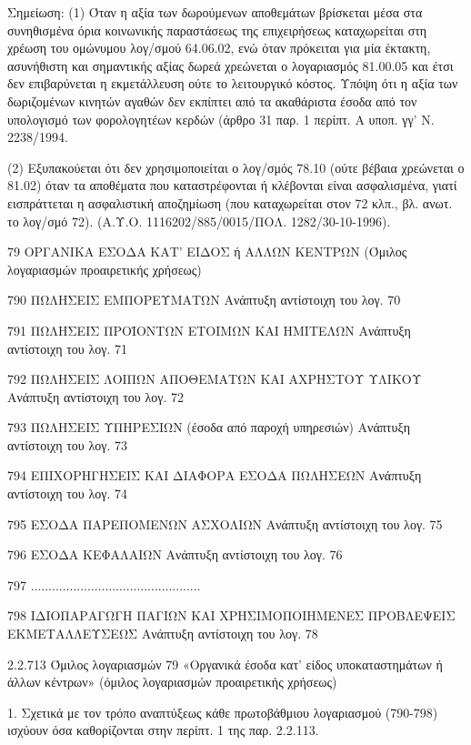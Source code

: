 \documentclass[A4,10pt,greek]{book}
\begin{document}
Σημείωση: (1) Όταν η αξία των δωρούμενων αποθεμάτων βρίσκεται μέσα στα συνηθισμένα όρια κοινωνικής παραστάσεως της επιχειρήσεως καταχωρείται στη χρέωση του ομώνυμου λογ/σμού 64.06.02, ενώ όταν πρόκειται για μία έκτακτη, ασυνήθιστη και σημαντικής αξίας δωρεά χρεώνεται ο λογαριασμός 81.00.05 και έτσι δεν επιβαρύνεται η εκμετάλλευση ούτε το λειτουργικό κόστος. Υπόψη ότι η αξία των δωριζομένων κινητών αγαθών δεν εκπίπτει από τα ακαθάριστα έσοδα από τον υπολογισμό των φορολογητέων κερδών (άρθρο 31 παρ. 1 περίπτ. Α υποπ. γγ' Ν. 2238/1994.

(2) Εξυπακούεται ότι δεν χρησιμοποιείται ο λογ/σμός 78.10 (ούτε βέβαια χρεώνεται ο 81.02) όταν τα αποθέματα που καταστρέφονται ή κλέβονται είναι ασφαλισμένα, γιατί εισπράττεται η ασφαλιστική αποζημίωση (που καταχωρείται στον 72 κλπ., βλ. ανωτ. το λογ/σμό 72). (Α.Υ.Ο. 1116202/885/0015/ΠΟΛ. 1282/30-10-1996).

79    ΟΡΓΑΝΙΚΑ ΕΣΟΔΑ ΚΑΤ' ΕΙΔΟΣ ή ΑΛΛΩΝ ΚΕΝΤΡΩΝ
        (Όμιλος λογαριασμών προαιρετικής χρήσεως)

        790    ΠΩΛΗΣΕΙΣ ΕΜΠΟΡΕΥΜΑΤΩΝ
                  Ανάπτυξη αντίστοιχη του λογ. 70

        791    ΠΩΛΗΣΕΙΣ ΠΡΟΪΟΝΤΩΝ ΕΤΟΙΜΩΝ ΚΑΙ ΗΜΙΤΕΛΩΝ
                  Ανάπτυξη αντίστοιχη του λογ. 71

        792    ΠΩΛΗΣΕΙΣ ΛΟΙΠΩΝ ΑΠΟΘΕΜΑΤΩΝ ΚΑΙ ΑΧΡΗΣΤΟΥ ΥΛΙΚΟΥ
                  Ανάπτυξη αντίστοιχη του λογ. 72

        793    ΠΩΛΗΣΕΙΣ ΥΠΗΡΕΣΙΩΝ (έσοδα από παροχή υπηρεσιών)
                  Ανάπτυξη αντίστοιχη του λογ. 73

        794    ΕΠΙΧΟΡΗΓΗΣΕΙΣ ΚΑΙ ΔΙΑΦΟΡΑ ΕΣΟΔΑ ΠΩΛΗΣΕΩΝ
                  Ανάπτυξη αντίστοιχη του λογ. 74

        795    ΕΣΟΔΑ ΠΑΡΕΠΟΜΕΝΩΝ ΑΣΧΟΛΙΩΝ
                 Ανάπτυξη αντίστοιχη του λογ. 75

        796    ΕΣΟΔΑ ΚΕΦΑΛΑΙΩΝ
                 Ανάπτυξη αντίστοιχη του λογ. 76

        797    ................................................

        798    ΙΔΙΟΠΑΡΑΓΩΓΗ ΠΑΓΙΩΝ ΚΑΙ ΧΡΗΣΙΜΟΠΟΙΗΜΕΝΕΣ
                  ΠΡΟΒΛΕΨΕΙΣ ΕΚΜΕΤΑΛΛΕΥΣΕΩΣ
                 Ανάπτυξη αντίστοιχη του λογ. 78

2.2.713 Όμιλος λογαριασμών 79 «Οργανικά έσοδα κατ' είδος υποκαταστημάτων
ή άλλων κέντρων» (όμιλος λογαριασμών προαιρετικής χρήσεως)

1. Σχετικά με τον τρόπο αναπτύξεως κάθε πρωτοβάθμιου λογαριασμού (790-798) ισχύουν όσα καθορίζονται στην περίπτ. 1 της παρ. 2.2.113.
\end{document}
